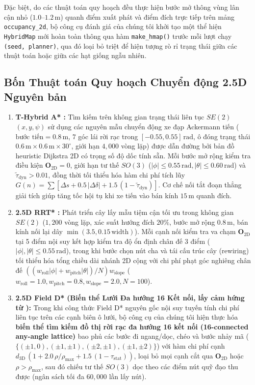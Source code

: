 \documentclass[a4paper,fleqn]{cas-sc}
\begin{document}
Đặc biệt, do các thuật toán quy hoạch đều thực hiện bước mở thông vùng lân cận nhỏ ($1.0\text{--}1.2\,\text{m}$) quanh điểm xuất phát và điểm đích trực tiếp trên mảng \texttt{occupancy\_2d}, bộ công cụ đánh giá của chúng tôi khởi tạo một thể hiện \texttt{HybridMap} mới hoàn toàn thông qua hàm \texttt{make\_hmap()} trước mỗi lượt chạy \texttt{(seed, planner)}, qua đó loại bỏ triệt để hiện tượng rò rỉ trạng thái giữa các thuật toán hoặc giữa các hạt giống ngẫu nhiên.

\subsection{Bốn Thuật toán Quy hoạch Chuyển động 2.5D Nguyên bản}
\label{subsec:planners}
\begin{enumerate}
    \item \textbf{T-Hybrid A* \citep{jiayangliu2023}:} Tìm kiếm trên không gian trạng thái liên tục $SE(2)$ $(x, y, \psi)$ sử dụng các nguyên mẫu chuyển động xe đạp Ackermann tiến ($\text{bước tiến} = 0.8\,\text{m}$, $7$ góc lái rời rạc trong $[-0.55, 0.55]\,\text{rad}$, ô đóng trạng thái $0.6\,\text{m} \times 0.6\,\text{m} \times 30^\circ$, giới hạn $4{,}000$ vòng lặp) được dẫn đường bởi bản đồ heuristic Dijkstra 2D có trọng số độ dốc tính sẵn. Mỗi bước mở rộng kiểm tra điều kiện $\mathbf{O}_{2\text{D}} = 0$, giới hạn tư thế $SO(3)$ ($|\phi| \le 0.55\,\text{rad}, |\theta| \le 0.60\,\text{rad}$) và $\tilde{\tau}_{\text{dyn}} > 0.01$, đồng thời tối thiểu hóa hàm chi phí tích lũy $G(n) = \sum [\Delta s + 0.5\,|\Delta\delta| + 1.5\,(1 - \tilde{\tau}_{\text{dyn}})]$. Cơ chế nối tắt đoạn thẳng giải tích giúp tăng tốc hội tụ khi xe tiến vào bán kính $15\,\text{m}$ quanh đích.
    \item \textbf{2.5D RRT* \citep{geraldsteinbauer2025}:} Phát triển cây lấy mẫu tiệm cận tối ưu trong không gian $SE(2)$ ($1{,}200$ vòng lặp, xác suất hướng đích $20\%$, bước mở rộng $0.8\,\text{m}$, bán kính nối lại dây $\min(3.5, 0.15\,\text{width})$). Mỗi cạnh nối kiểm tra va chạm $\mathbf{O}_{2\text{D}}$ tại 5 điểm nội suy kết hợp kiểm tra độ ổn định chân đế 3 điểm ($|\phi|, |\theta| \le 0.55\,\text{rad}$), trong khi bước chọn nút cha và tái cấu trúc cây (rewiring) tối thiểu hóa tổng chiều dài nhánh 2D cộng với chi phí phạt góc nghiêng chân đế $\left((w_{\text{roll}}|\phi| + w_{\text{pitch}}|\theta|)/N\right) w_{\text{slope}}$ ($w_{\text{roll}}=1.0, w_{\text{pitch}}=0.8, w_{\text{slope}}=2.0, N=100$).
    \item \textbf{2.5D Field D* (Biến thể Lưới Đa hướng 16 Kết nối, lấy cảm hứng từ \citealp{fergusondavid2005}):} Trong khi công thức Field D* nguyên gốc nội suy tuyến tính chi phí liên tục trên các cạnh biên ô lưới, bộ công cụ của chúng tôi hiện thực hóa \textbf{biến thể tìm kiếm đồ thị rời rạc đa hướng 16 kết nối (16-connected any-angle lattice)} bao phủ các bước đi ngang/dọc, chéo và bước nhảy mã ($\{(\pm 1,0), (\pm 1,\pm 1), (\pm 2,\pm 1), (\pm 1,\pm 2)\}$) với hàm chi phí cạnh $d_{3\text{D}}\,(1 + 2.0\,\rho/\rho_{\max} + 1.5\,(1 - \tau_{\text{stat}}))$, loại bỏ mọi cạnh cắt qua $\mathbf{O}_{2\text{D}}$ hoặc $\rho > \rho_{\max}$, sau đó chiếu tư thế $SO(3)$ dọc theo các điểm nút quỹ đạo thu được (ngân sách tối đa $60{,}000$ lần lấy nút).

\end{enumerate}
\end{document}
